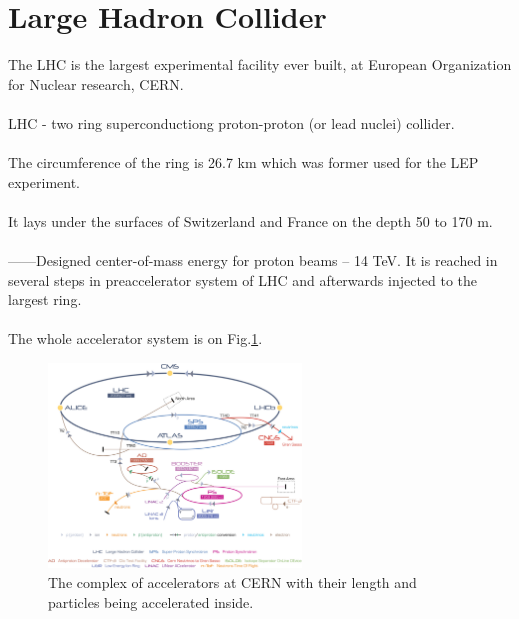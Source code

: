 \section{Large Hadron Collider}
The LHC is the largest experimental facility ever built, at European Organization for Nuclear research, CERN.
\\
\\
LHC - two ring superconductiong proton-proton (or lead nuclei) collider. 
\\
\\
The circumference of the ring is 26.7 km which was former used for the LEP experiment.
\\
\\
It lays under the surfaces of Switzerland and France on the depth 50 to 170 m.
\\
\\
------Designed center-of-mass energy for proton beams -- 14 TeV. It is reached in several steps in preaccelerator system of LHC
and afterwards injected to the largest ring.
\\
\\
The whole accelerator system is on Fig.\ref{fig:AccelCERN}.
\begin{figure}[t]
  \centering
  \includegraphics[width=0.6\textwidth]{02_experimental_setup/plots/Cern-Accelerator-Complex.png}
  \caption{The complex of accelerators at CERN with their length and particles being accelerated inside.}
  \label{fig:AccelCERN}
\end{figure}

